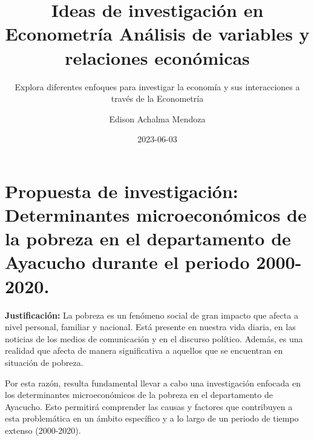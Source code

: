 \documentclass[
  letterpaper,
  DIV=11,
  numbers=noendperiod]{scrartcl}
\title{Ideas de investigación en Econometría Análisis de variables y
relaciones económicas}
\subtitle{Explora diferentes enfoques para investigar la economía y sus
interacciones a través de la Econometría}
\author{Edison Achalma Mendoza}
\date{2023-06-03}
\begin{document}
\maketitle
\ifdefined\Shaded\renewenvironment{Shaded}{\begin{tcolorbox}[boxrule=0pt, enhanced, frame hidden, sharp corners, breakable, interior hidden, borderline west={3pt}{0pt}{shadecolor}]}{\end{tcolorbox}}\fi

\hypertarget{propuesta-de-investigaciuxf3n-determinantes-microeconuxf3micos-de-la-pobreza-en-el-departamento-de-ayacucho-durante-el-periodo-2000-2020.}{%
\section{Propuesta de investigación: Determinantes microeconómicos de la
pobreza en el departamento de Ayacucho durante el periodo
2000-2020.}\label{propuesta-de-investigaciuxf3n-determinantes-microeconuxf3micos-de-la-pobreza-en-el-departamento-de-ayacucho-durante-el-periodo-2000-2020.}}

\textbf{Justificación:} La pobreza es un fenómeno social de gran impacto
que afecta a nivel personal, familiar y nacional. Está presente en
nuestra vida diaria, en las noticias de los medios de comunicación y en
el discurso político. Además, es una realidad que afecta de manera
significativa a aquellos que se encuentran en situación de pobreza.

Por esta razón, resulta fundamental llevar a cabo una investigación
enfocada en los determinantes microeconómicos de la pobreza en el
departamento de Ayacucho. Esto permitirá comprender las causas y
factores que contribuyen a esta problemática en un ámbito específico y a
lo largo de un periodo de tiempo extenso (2000-2020).
\end{document}
